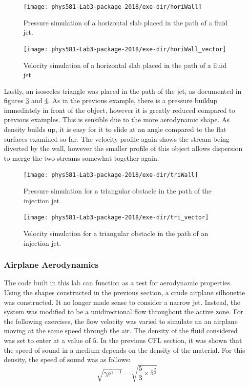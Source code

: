 \documentclass[twocolumn]{article}
\begin{document}
\begin{figure}
\centering
\texttt{[image: phys581-Lab3-package-2018/exe-dir/horiWall]}
\caption{Pressure simulation of a horizontal slab placed in the path of a fluid jet.}
\label{fig:horiWall}
\end{figure}

\begin{figure}
\centering
\texttt{[image: phys581-Lab3-package-2018/exe-dir/horiWall\_vector]}
\caption{Velocity simulation of a horizontal slab placed in the path of a fluid jet}
\label{fig:horiWall_vector}
\end{figure}

Lastly, an isosceles triangle was placed in the path of the jet, as documented in figures \ref{fig:triWall} and \ref{fig:tri_vector}. As in the previous example, there is a pressure buildup immediately in front of the object, however it is greatly reduced compared to previous examples. This is sensible due to the more aerodynamic shape. As density builds up, it is easy for it to slide at an angle compared to the flat surfaces examined so far. The velocity profile again shows the stream being diverted by the wall, however the smaller profile of this object allows dispersion to merge the two streams somewhat together again.

\begin{figure}
\centering
\texttt{[image: phys581-Lab3-package-2018/exe-dir/triWall]}
\caption{Pressure simulation for a triangular obstacle in the path of the injection jet.}
\label{fig:triWall}
\end{figure}

\begin{figure}
\centering
\texttt{[image: phys581-Lab3-package-2018/exe-dir/tri\_vector]}
\caption{Velocity simulation for a triangular obstacle in the path of an injection jet.}
\label{fig:tri_vector}
\end{figure}
 

\subsubsection{Airplane Aerodynamics}
The code built in this lab can function as a test for aerodynamic properties. Using the shapes constructed in the previous section, a crude airplane silhouette was constructed. It no longer made sense to consider a narrow jet. Instead, the system was modified to be a unidirectional flow throughout the active zone. For the following exercises, the flow velocity was varied to simulate an an airplane moving at the same speed through the air. The density of the fluid considered was set to enter at a value of $5$. In the previous CFL section, it was shown that the speed of sound in a medium depends on the density of the material. For this density, the speed of sound was as follows:
\begin{equation}
\sqrt{\gamma \rho^{\gamma-1}} = \sqrt{\frac{5}{3} \times 5^{\frac{2}{3}}}
\end{equation}
\end{document}
